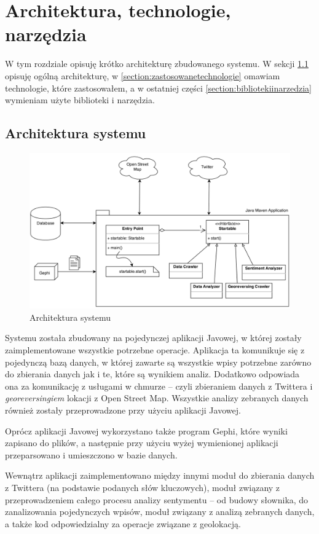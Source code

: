 \chapter{Architektura, technologie, narzędzia}
W tym rozdziale opisuję krótko architekturę zbudowanego systemu.
W sekcji \ref{section:architekturasystemu} opisuję ogólną architekturę,
w \ref{section:zastosowanetechnologie} omawiam technologie, które zastosowałem,
a w ostatniej części \ref{section:bibliotekiinarzedzia} wymieniam użyte
biblioteki i narzędzia.
\section{Architektura systemu}
\label{section:architekturasystemu}

\begin{figure}[ht!]
\centering
\includegraphics[width=160mm]{img/architektura.png}
\caption{Architektura systemu}
\label{image:architektura-systemu}
\end{figure}
Systemu została zbudowany na pojedynczej aplikacji Javowej,
w której zostały zaimplementowane wszystkie potrzebne operacje.
Aplikacja ta komunikuje się z pojedynczą bazą danych, w której zawarte
są wszystkie wpisy potrzebne zarówno do zbierania danych jak i te, które są
wynikiem analiz. Dodatkowo odpowiada ona za komunikację z usługami w chmurze --
czyli zbieraniem danych z Twittera i \textit{georeversingiem} lokacji z Open
Street Map. Wszystkie analizy zebranych danych również zostały przeprowadzone
przy użyciu aplikacji Javowej.

Oprócz aplikacji Javowej wykorzystano także program Gephi, które wyniki zapisano
do plików, a następnie przy użyciu wyżej wymienionej aplikacji przeparsowano i
umieszczono w bazie danych.

Wewnątrz aplikacji zaimplementowano między innymi moduł do zbierania danych z
Twittera (na podstawie podanych słów kluczowych), moduł związany z
przeprowadzeniem całego procesu analizy sentymentu -- od budowy słownika, do
zanalizowania pojedynczych wpisów, moduł związany z analizą zebranych danych,
a także kod odpowiedzialny za operacje związane z geolokacją.

